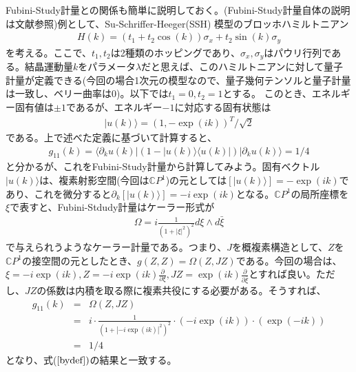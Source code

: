 \documentclass[12pt]{jsbook}
\newcommand{\la}{\langle}
\newcommand{\ra}{\rangle}
\newcommand{\pa}{\partial}
\begin{document}
Fubini-Study計量との関係も簡単に説明しておく。(Fubini-Study計量自体の説明は文献\cite{nakahara2018geometry}参照)例として、Su-Schriffer-Heeger(SSH) 模型のブロッホハミルトニアン\cite{asboth2016short}
\begin{eqnarray}
 H(k) = (t_1 + t_2 \cos(k))\sigma_x + t_2 \sin (k)\sigma_y
 \end{eqnarray}
 を考える。ここで、$t_1,t_2$は2種類のホッピングであり、$\sigma_x,\sigma_y$はパウリ行列である。結晶運動量$k$をパラメータ$\lambda$だと思えば、このハミルトニアンに対して量子計量が定義できる(今回の場合1次元の模型なので、量子幾何テンソルと量子計量は一致し、ベリー曲率は0)。以下では$t_1=0,t_2=1$とする。
 このとき、エネルギー固有値は$\pm 1$であるが、エネルギー$-1$に対応する固有状態は
 \begin{eqnarray}
     |u(k)\ra = (1,-\exp(ik))^{T}/\sqrt{2}
 \end{eqnarray}
 である。上で述べた定義に基づいて計算すると、
\begin{eqnarray}
\label{bydef}
g_{11}(k)=\la \pa_{k} u(k)|(1-|u(k)\ra\la u(k)|)|\pa_{k}u(k)\ra =1/4
\end{eqnarray}
と分かるが、これをFubini-Study計量から計算してみよう。固有ベクトル$|u(k)\ra$は、複素射影空間(今回は$\mathbb{C}P^1$)の元としては$[|u(k)\ra]=-\exp(ik)$であり、これを微分すると$\pa _k[|u(k)\ra]=-i\exp(ik)$となる。$\mathbb{C}P^1$の局所座標を$\xi$で表すと、Fubini-Stdudy計量はケーラー形式が
\begin{eqnarray}
\Omega = i \frac{1}{(1+|\xi|^2)^2}d\xi \wedge d \bar{\xi}
\end{eqnarray}
で与えられうようなケーラー計量である。つまり、$J$を概複素構造として、$Z$を$\mathbb{C}P^1$の接空間の元としたとき、$g(Z,Z)=\Omega(Z,JZ)$である。今回の場合は、
$ \xi = -i\exp(ik),Z = -i\exp(ik)\frac{\partial}{\partial \xi},JZ = \exp(ik)\frac{\partial}{\partial \bar{\xi}} $とすれば良い。ただし、$JZ$の係数は内積を取る際に複素共役にする必要がある。そうすれば、
\begin{eqnarray}
    g_{11}(k) &=&\Omega(Z,JZ) \\
    &=& i\cdot \frac{1}{(1+|-i\exp(ik)|^2)^2}\cdot (-i\exp(ik))\cdot(\exp(-ik))\\
    &=&1/4
\end{eqnarray}
となり、式($\ref{bydef})$の結果と一致する。
\end{document}
